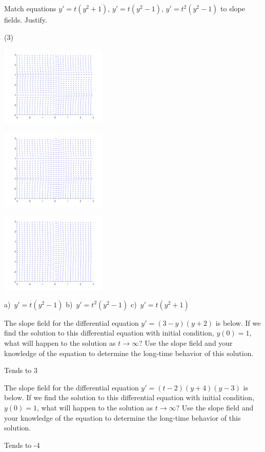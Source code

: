 \begin{exercise}
Match equations $y'=t(y^2 + 1)$, $y'=t(y^2 - 1)$, $y' = t^2(y^2 - 1)$ to slope fields.
Justify.
\begin{tasks}(3)
\task
\parbox[c]{1.75in}{\includegraphics[width=2in]{Images/yprimetysqm1slope}}
\task
\parbox[c]{1.75in}{\includegraphics[width=2in]{Images/yprimetsqysqm1slope}}
\task
\parbox[c]{1.75in}{\includegraphics[width=2in]{Images/yprimetysqp1slope}}
\end{tasks}
\end{exercise}
\comboSol{%
}
{%
a)~$y'=t(y^2 -1)$ \quad b)~$y'=t^2(y^2 - 1)$ \quad c)~$y'=t(y^2 + 1)$
}

\begin{exercise}\label{ex:3myyp2}
The slope field for the differential equation $y' = (3-y)(y+2)$ is below. 
If we find the solution to this differential equation with initial condition, $y(0) = 1$, what will happen to the solution as $t \rightarrow \infty$? Use the slope field and your knowledge of the equation to determine the long-time behavior of this solution.
\end{exercise}
\comboSol{%
}
{%
Tends to 3
}

\begin{exercise}\label{ex:tm2yp4ym3}
The slope field for the differential equation $y' = (t-2)(y+4)(y-3)$ is below. 
If we find the solution to this differential equation with initial condition, $y(0) = 1$, what will happen to the solution as $t \rightarrow \infty$? Use the slope field and your knowledge of the equation to determine the long-time behavior of this solution.
\end{exercise}
\comboSol{%
}
{%
Tends to -4
}

